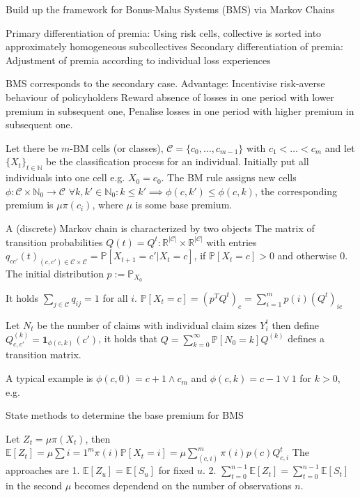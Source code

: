Build up the framework for Bonus-Malus Systems (BMS) via Markov Chains

Primary differentiation of premia: 
Using risk cells, collective is sorted into
approximately homogeneous subcollectives
Secondary differentiation of premia: 
Adjustment of premia according to individual loss experiences

BMS corresponds to the secondary case.
Advantage: Incentivise risk-averse behaviour of policyholders
Reward absence of losses in one period with lower premium in subsequent one,
Penalise losses in one period with higher premium in subsequent one.

Let there be \( m \)-BM cells (or classes), \( \mathcal{C} = \{c_0, \dots, c_{m-1}\} \)
with \( c_1 < \dots < c_m \) and let \( \{X_t\}_{t \in \mathbb{N}} \) be the classification process
for an individual.
Initially put all individuals into one cell e.g. \( X_0 = c_0 \).
The BM rule assigns new cells \( \phi : \mathcal{C} \times \mathbb{N}_0 \to \mathcal{C} \)
\( \forall k, k' \in \mathbb{N}_0 : k \leq k' \implies \phi(c, k') \leq \phi(c, k) \),
the corresponding premium is \( \mu \pi(c_i) \), where \( \mu \) is some base premium.

A (discrete) Markov chain is characterized by two objects
The matrix of transition probabilities 
\( Q(t) = Q^t : \mathbb{R}^{|\mathcal{C}|} \times \mathbb{R}^{|\mathcal{C}|}\)
with entries
\( q_{cc'}(t)_{(c,c') \in \mathcal{C} \times \mathcal{C}} = \mathbb{P}[X_{t+1} = c' |X_t = c] \),
if \( \mathbb{P}[X_t = c] > 0 \) and otherwise \( 0\).
The initial distribution \( p := \mathbb{P}_{X_0} \)

It holds
\( \sum_{j \in \mathcal{C}} q_{ij} = 1 \) for all \( i \).
\( \mathbb{P}[X_t = c] = (p^TQ^t)_c = \sum_{i=1}^m p(i)(Q^t)_{ic} \)

Let \( N_t \) be the number of claims with individual claim sizes \( Y_i^t \)
then define \( Q^{(k)}_{c,c'} = \mathbf{1}_{\phi(c,k)}(c') \), it holds
that \( Q = \sum_{k=0}^\infty \mathbb{P}[N_0 = k] Q^{(k)} \) defines a transition matrix.

A typical example is \( \phi(c, 0) = c + 1 \wedge c_m \) and \( \phi(c, k) = c - 1 \vee 1 \) for \( k > 0 \),
e.g.


State methods to determine the base premium for BMS

Let \( Z_t = \mu\pi(X_t) \), then 
\( \mathbb{E}[Z_t] = \mu \sum{i=1}^m \pi(i)\mathbb{P}[X_t = i] = \mu \sum_{(c,i)}^m \pi(i)p(c)Q^t_{c,i} \)
The approaches are
1. \( \mathbb{E}[Z_u] = \mathbb{E}[S_u] \) for fixed \( u \).
2. \( \sum_{t=0}^{n-1} \mathbb{E}[Z_t] = \sum_{t=0}^{n-1}\mathbb{E}[S_t] \)
in the second \( \mu \) becomes dependend on the number of observations \( n \).

